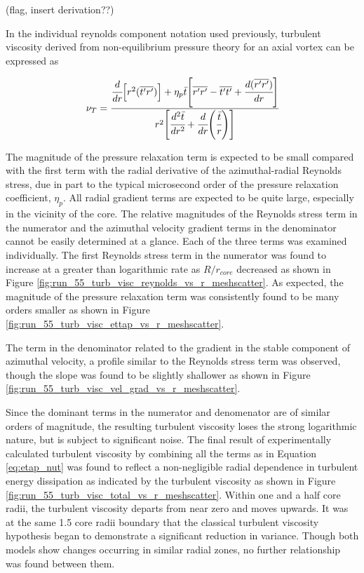 (flag, insert derivation??)

In the individual reynolds component notation used previously, turbulent 
viscosity derived from non-equilibrium pressure theory for an axial vortex can 
be expressed as

\begin{equation}
\nu_T =
    \cfrac{\cfrac{d}{dr}\Big[r^2 (\overline{t^\prime r^\prime})\Big] +
	\eta_p \bar{t}\Bigg[\overline{r^\prime r^\prime} - \overline{t^\prime 
	t^\prime} + \cfrac{d(\overline{r^\prime r^\prime})}{dr}\Bigg]}
	{r^2\Bigg[\cfrac{d^2 \bar{t}}{dr^2} + \cfrac{d}{dr}
	\Bigg(\cfrac{\bar{t}}{r}\Bigg)\Bigg]}
\label{eq:etap_nut}
\end{equation}

\noindent
The magnitude of the pressure relaxation term is expected to be small compared 
with the first term with the radial derivative of the azimuthal-radial Reynolds 
stress, due in part to the typical microsecond order of the pressure relaxation 
coefficient, $\eta_p$. All radial gradient terms are expected to be quite 
large, especially in the vicinity of the core. The relative magnitudes of the 
Reynolds stress term in the numerator and the azimuthal velocity gradient terms 
in the denominator cannot be easily determined at a glance. Each of the three 
terms was examined individually. The first Reynolds stress term in the 
numerator was found to increase at a greater than logarithmic rate as 
$R/r_{core}$ decreased as shown in Figure 
\ref{fig:run_55_turb_visc_reynolds_vs_r_meshscatter}. As expected, the 
magnitude of the pressure relaxation term was consistently found to be many 
orders smaller as shown in Figure 
\ref{fig:run_55_turb_visc_ettap_vs_r_meshscatter}.




The term in the denominator related to the gradient in the stable component of 
azimuthal velocity, a profile similar to the Reynolds stress term was observed, 
though the slope was found to be slightly shallower as shown in Figure 
\ref{fig:run_55_turb_visc_vel_grad_vs_r_meshscatter}.



Since the dominant terms in the numerator and denomenator are of similar orders 
of magnitude, the resulting turbulent viscosity loses the strong logarithmic 
nature, but is subject to significant noise. The final result of experimentally 
calculated turbulent viscosity by combining all the terms as in Equation 
\ref{eq:etap_nut} was found to reflect a non-negligible radial dependence in 
turbulent energy dissipation as indicated by the turbulent viscosity as shown 
in Figure \ref{fig:run_55_turb_visc_total_vs_r_meshscatter}. Within one and a 
half core radii, the turbulent viscosity departs from near zero and moves 
upwards. It was at the same 1.5 core radii boundary that the classical 
turbulent viscosity hypothesis began to demonstrate a significant reduction in 
variance. Though both models show changes occurring in similar radial zones, no 
further relationship was found between them.

